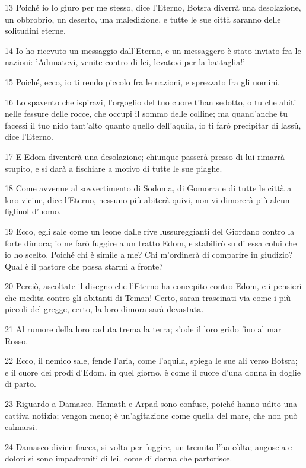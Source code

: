\par 13 Poiché io lo giuro per me stesso, dice l'Eterno, Botsra diverrà una desolazione, un obbrobrio, un deserto, una maledizione, e tutte le sue città saranno delle solitudini eterne.
\par 14 Io ho ricevuto un messaggio dall'Eterno, e un messaggero è stato inviato fra le nazioni: 'Adunatevi, venite contro di lei, levatevi per la battaglia!'
\par 15 Poiché, ecco, io ti rendo piccolo fra le nazioni, e sprezzato fra gli uomini.
\par 16 Lo spavento che ispiravi, l'orgoglio del tuo cuore t'han sedotto, o tu che abiti nelle fessure delle rocce, che occupi il sommo delle colline; ma quand'anche tu facessi il tuo nido tant'alto quanto quello dell'aquila, io ti farò precipitar di lassù, dice l'Eterno.
\par 17 E Edom diventerà una desolazione; chiunque passerà presso di lui rimarrà stupito, e si darà a fischiare a motivo di tutte le sue piaghe.
\par 18 Come avvenne al sovvertimento di Sodoma, di Gomorra e di tutte le città a loro vicine, dice l'Eterno, nessuno più abiterà quivi, non vi dimorerà più alcun figliuol d'uomo.
\par 19 Ecco, egli sale come un leone dalle rive lussureggianti del Giordano contro la forte dimora; io ne farò fuggire a un tratto Edom, e stabilirò su di essa colui che io ho scelto. Poiché chi è simile a me? Chi m'ordinerà di comparire in giudizio? Qual è il pastore che possa starmi a fronte?
\par 20 Perciò, ascoltate il disegno che l'Eterno ha concepito contro Edom, e i pensieri che medita contro gli abitanti di Teman! Certo, saran trascinati via come i più piccoli del gregge, certo, la loro dimora sarà devastata.
\par 21 Al rumore della loro caduta trema la terra; s'ode il loro grido fino al mar Rosso.
\par 22 Ecco, il nemico sale, fende l'aria, come l'aquila, spiega le sue ali verso Botsra; e il cuore dei prodi d'Edom, in quel giorno, è come il cuore d'una donna in doglie di parto.
\par 23 Riguardo a Damasco. Hamath e Arpad sono confuse, poiché hanno udito una cattiva notizia; vengon meno; è un'agitazione come quella del mare, che non può calmarsi.
\par 24 Damasco divien fiacca, si volta per fuggire, un tremito l'ha còlta; angoscia e dolori si sono impadroniti di lei, come di donna che partorisce.
